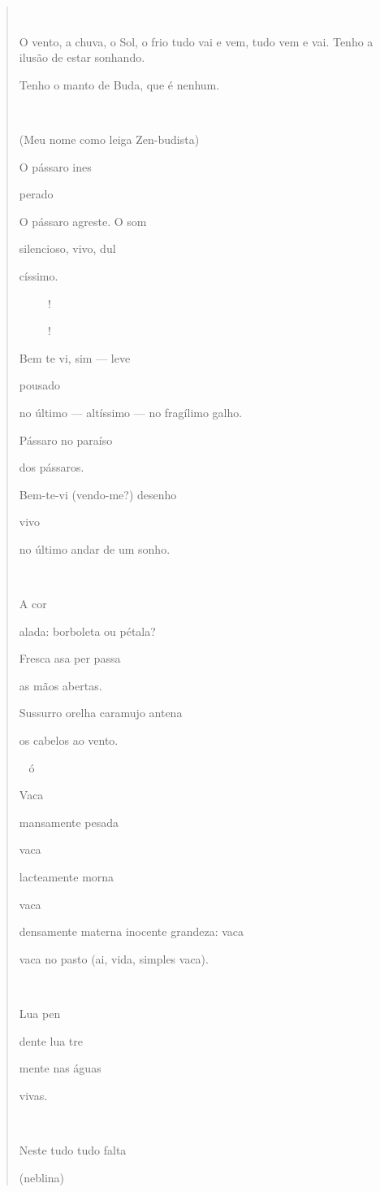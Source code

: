 \begin{quote}


O vento, a chuva, o Sol, o frio tudo vai e vem, tudo vem e vai. Tenho a
ilusão de estar sonhando.

Tenho o manto de Buda, que é nenhum.

 

(Meu nome como leiga Zen-budista)

O pássaro ines

perado

O pássaro agreste. O som

silencioso, vivo, dul

císsimo.

!

!

Bem te vi, sim --- leve

pousado

no último --- altíssimo --- no fragílimo galho.

Pássaro no paraíso

dos pássaros.

Bem-te-vi (vendo-me?) desenho

vivo

no último andar de um sonho.



A cor

alada: borboleta ou pétala?

Fresca asa per passa

as mãos abertas.

Sussurro orelha caramujo antena

os cabelos ao vento.

ó

Vaca

mansamente pesada

vaca

lacteamente morna

vaca

densamente materna inocente grandeza: vaca

vaca no pasto (ai, vida, simples vaca).



Lua pen

dente lua tre

mente nas águas

vivas.



Neste tudo tudo falta

(neblina)


\end{quote}
